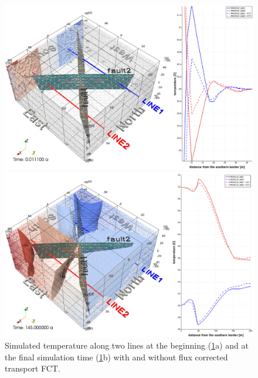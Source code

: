 \begin{figure}[htbp]
    \begin{center}
        \begin{minipage}{0.72\textwidth}
            \includegraphics[width=1\textwidth]{PART_II/T/2u2f_fig7a.eps}
        \end{minipage}
        \begin{minipage}{0.72\textwidth}
            \includegraphics[width=1\textwidth]{PART_II/T/2u2f_fig7b.eps}
        \end{minipage}
        \caption{Simulated temperature along two lines at the beginning (\ref{fig7}a) and at the final simulation time (\ref{fig7}b) with and without flux corrected transport FCT.}
        \label{fig7}
    \end{center}
\end{figure}

